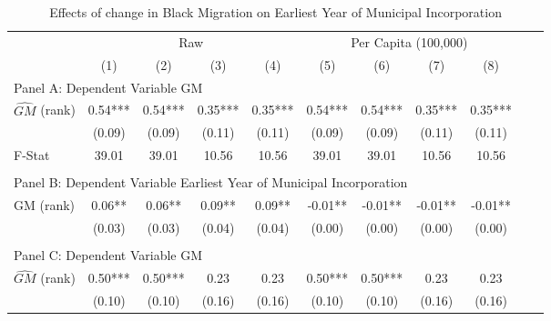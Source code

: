  \begin{table}[htbp]\centering {} \begin{threeparttable} \caption{Effects of change in Black Migration on Earliest Year of Municipal Incorporation} \begin{tabular}{l*{10}{c}} \toprule
                &\multicolumn{4}{c}{Raw}                                    &\multicolumn{4}{c}{Per Capita (100,000)}                   \\\cmidrule(lr){2-5}\cmidrule(lr){6-9}
                &\multicolumn{1}{c}{(1)}   &\multicolumn{1}{c}{(2)}   &\multicolumn{1}{c}{(3)}   &\multicolumn{1}{c}{(4)}   &\multicolumn{1}{c}{(5)}   &\multicolumn{1}{c}{(6)}   &\multicolumn{1}{c}{(7)}   &\multicolumn{1}{c}{(8)}   \\
\cmidrule(lr){1-9}
\multicolumn{8}{l}{Panel A: Dependent Variable GM}\\
\cmidrule(lr){1-9}
$\hat{GM}$ (rank)&       0.54***&       0.54***&       0.35***&       0.35***&       0.54***&       0.54***&       0.35***&       0.35***\\
                &     (0.09)   &     (0.09)   &     (0.11)   &     (0.11)   &     (0.09)   &     (0.09)   &     (0.11)   &     (0.11)   \\
\midrule
F-Stat          &      39.01   &      39.01   &      10.56   &      10.56   &      39.01   &      39.01   &      10.56   &      10.56   \\
\cmidrule[\heavyrulewidth](lr){1-9} \\ \cmidrule[\heavyrulewidth](lr){1-9}
\multicolumn{8}{l}{Panel B: Dependent Variable Earliest Year of Municipal Incorporation}\\
\cmidrule(lr){1-9}
GM  (rank)      &       0.06** &       0.06** &       0.09** &       0.09** &      -0.01** &      -0.01** &      -0.01** &      -0.01** \\
                &     (0.03)   &     (0.03)   &     (0.04)   &     (0.04)   &     (0.00)   &     (0.00)   &     (0.00)   &     (0.00)   \\
\cmidrule[\heavyrulewidth](lr){1-9} \\ \cmidrule[\heavyrulewidth](lr){1-9}
\multicolumn{8}{l}{Panel C: Dependent Variable GM}\\
\cmidrule(lr){1-9}
$\hat{GM}$ (rank)&       0.50***&       0.50***&       0.23   &       0.23   &       0.50***&       0.50***&       0.23   &       0.23   \\
                &     (0.10)   &     (0.10)   &     (0.16)   &     (0.16)   &     (0.10)   &     (0.10)   &     (0.16)   &     (0.16)   \\

\end{tabular}
\end{threeparttable}
\end{table}
